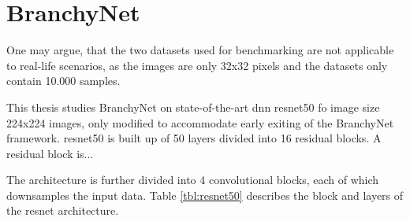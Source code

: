 \section{BranchyNet}


One may argue, that the two datasets used for benchmarking are not applicable to real-life scenarios, as the images are only 32x32 pixels and the datasets only contain 10.000 samples.



This thesis studies BranchyNet on state-of-the-art \gls{dnn} \gls{resnet}50 fo image size 224x224 images, only modified to accommodate early exiting of the BranchyNet framework. \gls{resnet}50 is built up of 50 layers divided into 16 residual blocks. A residual block is...


The architecture is further divided into 4 convolutional blocks, each of which downsamples the input data. Table \ref{tbl:resnet50} describes the block and layers of the \gls{resnet} architecture. 

